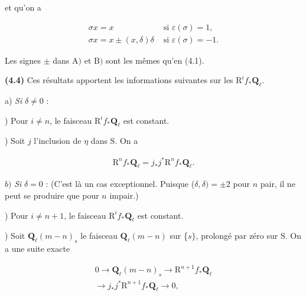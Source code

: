 \documentclass[10pt,leqno]{article}
\begin{document}
\noindent et qu’on a\par

\[\begin{array}{ll}\sigma x = x&\text{ si }\varepsilon (\sigma )=1,\\\sigma x = x \pm  (x,\delta )\delta &\text{ si }\varepsilon (\sigma )=- 1.\end{array}\]

\noindent Les signes \(\pm \) dans \(\mathrm{A})\) et \(\mathrm{B})\) sont les mêmes qu’en (4.1).\par

\noindent \textbf{(4.4)} Ces résultats apportent les informations suivantes sur les \(\mathrm{R}^{i} f_{*}\mathbf{Q}_{\ell }\).\par

\noindent a) \emph{Si} \(\delta \ne 0\) :\par

) Pour \(i\ne n\), le faisceau \(\mathrm{R}^{i} f_{*}\mathbf{Q}_{\ell }\) est constant.\par

) Soit \(j\) l’inclusion de \(\eta \) dans \(\mathrm{S}\). On a\par

\begin{equation*}\begin{gathered}\mathrm{R}^{n} f_{*}\mathbf{Q}_{\ell } = j_{*}j^{*}\mathrm{R}^{n} f_{*}\mathbf{Q}_{\ell }.\end{gathered}\end{equation*}

\noindent \(b)\) \emph{Si} \(\delta =0\) : (C’est là un cas exceptionnel. Puisque (\(\delta ,\delta )=\pm 2\) pour \(n\) pair, il ne peut se produire que pour \(n\) impair.)\par

) Pour \(i\ne n+1\), le faisceau \(\mathrm{R}^{i} f_{*}\mathbf{Q}_{\ell }\) est constant.\par

) Soit \(\mathbf{Q}_{\ell }(m- n)_{s}\) le faisceau \(\mathbf{Q}_{\ell }(m- n)\) sur \{\(s\}\), prolongé par zéro sur \(\mathrm{S}\). On a une suite exacte\par

\begin{equation*}\begin{gathered}0 \longrightarrow  \mathbf{Q}_{\ell }(m- n)_{s} \longrightarrow  \mathrm{R}^{n+1}f_{*}\mathbf{Q}_{\ell } \\ \longrightarrow  j_{*}j^{*}\mathrm{R}^{n+1}f_{*}\mathbf{Q}_{\ell } \longrightarrow  0,\end{gathered}\end{equation*}
\end{document}
